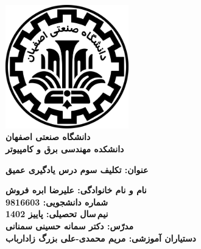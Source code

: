 \begin{titlepage}
\begin{center}
\includegraphics[width=0.4\textwidth]{figures/IUT Logo.png}\\
        
\LARGE
\textbf{دانشگاه صنعتی اصفهان}\\
\textbf{دانشکده مهندسی برق و کامپیوتر}\\
        
\vfill
        
\huge
\textbf{عنوان: تکلیف سوم درس یادگیری عمیق}\\
        
\vfill
        
\LARGE
\textbf{نام و نام خانوادگی: علیرضا ابره فروش}\\
\textbf{شماره دانشجویی: 9816603}\\
\textbf{نیم\,سال تحصیلی: پاییز 1402}\\
\textbf{مدرّس: دکتر سمانه حسینی سمنانی}\\
\textbf{دستیاران آموزشی: مریم محمدی-علی بزرگ زادارباب}\\
\end{center}
\end{titlepage}
